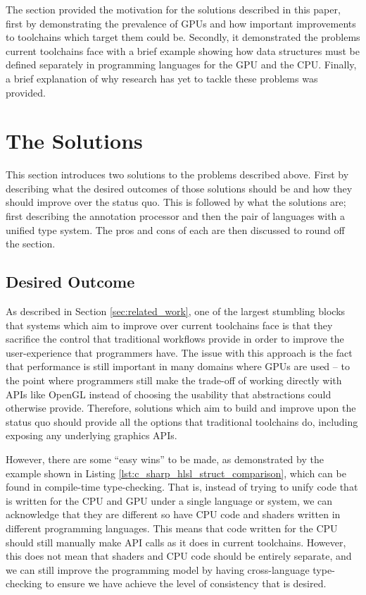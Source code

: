\documentclass[a4paper,12pt,twoside,openright]{report}
\begin{document}
The section provided the motivation for the solutions described in this paper,
first by demonstrating the prevalence of GPUs and how important improvements to
toolchains which target them could be. Secondly, it demonstrated the problems
current toolchains face with a brief example showing how data structures must be
defined separately in programming languages for the GPU and the CPU. Finally, a
brief explanation of why research has yet to tackle these problems was
provided.

\section{The Solutions}

This section introduces two solutions to the problems described above. First
by describing what the desired outcomes of those solutions should be and how
they should improve over the status quo. This is followed by what the solutions
are; first describing the annotation processor and then the pair of languages
with a unified type system. The pros and cons of each are then discussed to
round off the section.

\subsection{Desired Outcome}

As described in Section \ref{sec:related_work}, one of the largest stumbling
blocks that systems which aim to improve over current toolchains face is that
they sacrifice the control that traditional workflows provide in order to
improve the user-experience that programmers have. The issue with this approach
is the fact that performance is still important in many domains where GPUs are
used -- to the point where programmers still make the trade-off of working
directly with APIs like OpenGL instead of choosing the usability that
abstractions could otherwise provide. Therefore, solutions which aim to build
and improve upon the status quo should provide all the options that traditional
toolchains do, including exposing any underlying graphics APIs.

However, there are some ``easy wins'' to be made, as demonstrated by the
example shown in Listing \ref{lst:c_sharp_hlsl_struct_comparison}, which can be
found in compile-time type-checking. That is, instead of trying to unify code
that is written for the CPU and GPU under a single language or system, we can
acknowledge that they are different so have CPU code and shaders written in
different programming languages. This means that code written for the CPU
should still manually make API calls as it does in current toolchains. However,
this does not mean that shaders and CPU code should be entirely separate, and
we can still improve the programming model by having cross-language
type-checking to ensure we have achieve the level of consistency that is
desired.
\end{document}
